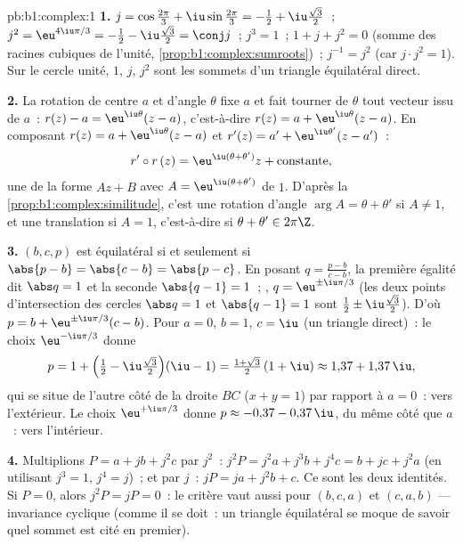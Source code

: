 \begin{solution}{pb:b1:complex:1}
\textbf{1.} $j = \cos\frac{2\pi}3 + \iu\sin\frac{2\pi}3 = -\frac12
+ \iu\frac{\sqrt3}2$~; $j^2 = \eu^{4\iu\pi/3} = -\frac12 -
\iu\frac{\sqrt3}2 = \conj j$~; $j^3 = 1$~; $1 + j + j^2 = 0$ (somme
des racines cubiques de l'unité, \cref{prop:b1:complex:sumroots})~;
$j^{-1} = j^2$ (car $j \cdot j^2 = 1$). Sur le cercle unité, $1$,
$j$, $j^2$ sont les sommets d'un triangle équilatéral direct.

\textbf{2.} La rotation de centre $a$ et d'angle $\theta$ fixe $a$
et fait tourner de $\theta$ tout vecteur issu de $a$~: $r(z) - a =
\eu^{\iu\theta}(z - a)$, c'est-à-dire $r(z) = a + \eu^{\iu\theta}(z
- a)$. En composant $r(z) = a + \eu^{\iu\theta}(z-a)$ et $r'(z) = a'
+ \eu^{\iu\theta'}(z-a')$~:
\[
r' \circ r\,(z) = \eu^{\iu(\theta + \theta')} z +
\text{constante},
\]
une  de la forme $Az + B$ avec $A =
\eu^{\iu(\theta+\theta')}$ de  $1$. D'après la
\cref{prop:b1:complex:similitude}, c'est une rotation d'angle $\arg
A = \theta + \theta'$ si $A \neq 1$, et une translation si $A = 1$,
c'est-à-dire si $\theta + \theta' \in 2\pi\Z$.

\textbf{3.} $(b, c, p)$ est équilatéral si et seulement si $\abs{p -
b} = \abs{c - b} = \abs{p - c}$. En posant $q = \frac{p - b}{c -
b}$, la première égalité dit $\abs q = 1$ et la seconde $\abs{q - 1}
= 1$~; , $q = \eu^{\pm\iu\pi/3}$ (les deux points
d'intersection des cercles $\abs q = 1$ et $\abs{q - 1} = 1$ sont
$\frac12 \pm \iu\frac{\sqrt3}2$). D'où $p = b + \eu^{\pm\iu\pi/3}(c
- b)$. Pour $a = 0$, $b = 1$, $c = \iu$ (un triangle direct)~: le
choix $\eu^{-\iu\pi/3}$ donne
\[
p = 1 + \Bigl(\tfrac12 - \iu\tfrac{\sqrt3}2\Bigr)(\iu - 1)
= \tfrac{1 + \sqrt3}2\,(1 + \iu) \approx 1{,}37 + 1{,}37\,\iu ,
\]
qui se situe de l'autre côté de la droite $BC$ ($x + y = 1$) par
rapport à $a = 0$~: vers l'extérieur. Le choix $\eu^{+\iu\pi/3}$
donne $p \approx -0{,}37 - 0{,}37\,\iu$, du même côté que $a$~: vers
l'intérieur.

\textbf{4.} Multiplions $P = a + jb + j^2c$ par $j^2$~: $j^2 P = j^2
a + j^3 b + j^4 c = b + jc + j^2 a$ (en utilisant $j^3 = 1$, $j^4 =
j$)~; et par $j$~: $jP = ja + j^2 b + c$. Ce sont les deux
identités. Si $P = 0$, alors $j^2 P = jP = 0$~: le critère vaut
aussi pour $(b, c, a)$ et $(c, a, b)$ --- invariance cyclique (comme
il se doit~: un triangle équilatéral se moque de savoir quel sommet
est cité en premier).


\end{solution}
